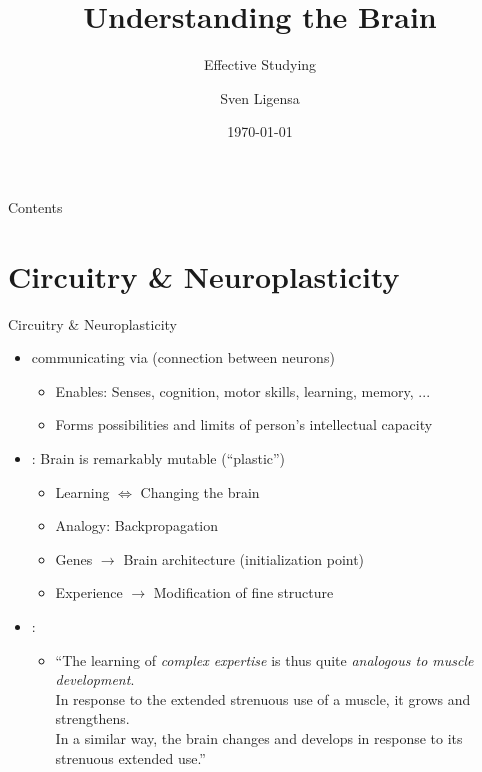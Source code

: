 \documentclass{ercisbeamer}
\title{Understanding the Brain}
\subtitle{Effective Studying}
\author{Sven Ligensa}
\institute{European Research Center for Information Systems (ERCIS)}
\date{\today}
\begin{document}
\begin{frame}
    \begin{tbox}
        \titlepage
    \end{tbox}
\end{frame}
\setbgimage{}

\begin{frame}{Contents}
    \tableofcontents
\end{frame}

\section{Circuitry \& Neuroplasticity}
\begin{frame}{Circuitry \& Neuroplasticity}
    \begin{tbox}
        \begin{itemize}
            \item {} communicating via  (connection between neurons)
            \begin{itemize}
                \item Enables: Senses, cognition, motor skills, learning, memory, ...
                \item Forms possibilities and limits of person's intellectual capacity
            \end{itemize}
            \item {}: Brain is remarkably mutable (``plastic'')
            \begin{itemize}
                \item Learning $\Leftrightarrow$ Changing the brain
                \item Analogy: Backpropagation 
                \item Genes $\rightarrow$ Brain architecture (initialization point)
                \item Experience $\rightarrow$ Modification of fine structure
            \end{itemize}
        \end{itemize}
    \end{tbox}

    \begin{tbox}
        \begin{itemize}
            \item \citet{wieman12}: 
            \begin{itemize}
                \item ``The learning of \emph{complex expertise} is thus quite \emph{analogous to muscle development}. \\
                In response to the extended strenuous use of a muscle, it grows and strengthens. \\
                In a similar way, the brain changes and develops in response to its strenuous extended use.''
            \end{itemize}
        \end{itemize}
    \end{tbox}


\end{frame}
\end{document}
